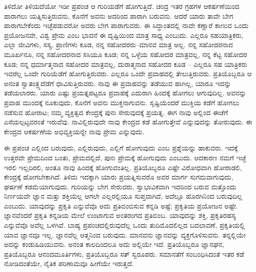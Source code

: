 ತಿಳಿದೋ ತಿಳಿಯದೆಯೋ ಇಡೀ ಪ್ರಪಂಚ ಆ ಗುರಿಯಡೆಗೆ ಹೋಗುತ್ತಿದೆ. ಚಂದ್ರ ಇತರ ಗ್ರಹಗಳ ಆಕರ್ಷಣೆಯಿಂದ ಪಾರಾಗಲು ಯತ್ನಿಸುತ್ತಿರುವನು, ಕೊನೆಗೆ ಅವನು ಅದರಿಂದ ಪಾರಾಗಿ ಬರುವನು. ಆದರೆ ಯಾರು ತಾವೇ ಬೇಗ ಪಾರಾಗಬೇಕೆಂದು ಇಚ್ಛೆಪಡುವರೋ ಅವರು ಬೇಗ ಪಾರಾಗುವರು. ಈ ಸಿದ್ಧಾಂತದಲ್ಲಿ ನಾವೇ ಕಣ್ಣಾರೆ ಕಾಣುವ ಒಂದು ಪ್ರಯೋಜನವೇ, ವಿಶ್ವ ಪ್ರೇಮ ಎಂಬ ಭಾವನೆ ಈ ದೃಷ್ಟಿಯಿಂದ ಮಾತ್ರ ಸಾಧ್ಯ ಎಂಬುದು. ಎಲ್ಲರೂ ಸಹಯಾತ್ರಿಕರು, ಎಲ್ಲಾ ಜೀವಿಗಳು, ಸಸ್ಯ, ಪ್ರಾಣಿಗಳು ಕೂಡ, ನನ್ನ ಸಹೋದರರು–ಮಾನವ ಮಾತ್ರ ಅಲ್ಲ. ನನ್ನ ಸಹೋದರನಾದ ಮೂರ್ಖನೂ, ನನ್ನ ಸಹೋದರನಾದ ಸಸಿಯೂ ಕೂಡ; ನನ್ನ ಒಳ್ಳೆಯ ಸಹೋದರ ಮಾತ್ರವಲ್ಲ, ನನ್ನ ಕೆಟ್ಟ ಸಹೋದರ ಕೂಡ; ನನ್ನ ಧರ್ಮಾತ್ಮನಾದ ಸಹೋದರ ಮಾತ್ರವಲ್ಲ, ದುರಾತ್ಮನಾದ ಸಹೋದರ ಕೂಡ – ಎಲ್ಲರೂ ಸಹ ಯಾತ್ರಿಕರು ಇವರೆಲ್ಲ ಒಂದೇ ಗುರಿಯೆಡೆಗೆ ಹೋಗುತ್ತಿರುವರು. ಎಲ್ಲರೂ ಒಂದೇ ಪ್ರವಾಹದಲ್ಲಿ ತೇಲುತ್ತಿರುವರು. ಪ್ರತಿಯೊಬ್ಬರೂ ಆ ಅನಂತ ಸ್ವಾತಂತ್ರ್ಯದೆಡೆಗೆ ಧಾವಿಸುತ್ತಿರುವರು. ನಾವು ಈ ಪ್ರವಾಹವನ್ನು ತಡೆಯುವ ಹಾಗಿಲ್ಲ, ಯಾರೂ ಇದನ್ನು ತಡೆಯಲಾರರು. ಯಾರು ಎಷ್ಟು ಪ್ರಯತ್ನಪಟ್ಟರೂ ಪ್ರವಾಹಕ್ಕೆ ಎದುರಾಗಿ ಹಿಂದಕ್ಕೆ ಹೋಗಲು ಆಗುವುದಿಲ್ಲ. ಅವನನ್ನು ಪ್ರವಾಹ ಮುಂದಕ್ಕೆ ನೂಕುವುದು, ಕೊನೆಗೆ ಅವನು ಮುಕ್ತನಾಗುವನು. ಸೃಷ್ಟಿಯೆಂದರೆ ಮುಕ್ತಿಯ ಕಡೆಗೆ ಹೋಗಲು ನಡೆಸುವ ಹೋರಾಟ; ನಮ್ಮ ವ್ಯಕ್ತಿತ್ವದ ಕೇಂದ್ರಕ್ಕೆ ಪುನಃ ಸೇರುವುದಕ್ಕೆ ಪ್ರಯತ್ನ. ಈಗ ನಾವು ಅಲ್ಲಿಂದ ಈಚೆಗೆ ಎಸೆಯಲ್ಪಟ್ಟವರಂತೆ ಇರುವೆವು. ನಾವಿಲ್ಲಿರುವುದೇ ನಾವು ಕೇಂದ್ರದ ಕಡೆ ಹೋಗುತ್ತೇವೆ ಎನ್ನುವುದನ್ನು ತೋರುವುದು. ಈ ಕೇಂದ್ರದ ಆಕರ್ಷಣೆಯ ಅಭಿವ್ಯಕ್ತಿಯನ್ನೇ ನಾವು ಪ್ರೇಮ ಎನ್ನುವುದು.

ಈ ಪ್ರಪಂಚ ಎಲ್ಲಿಂದ ಬರುವುದು, ಎಲ್ಲಿರುವುದು, ಎಲ್ಲಿಗೆ ಹೋಗುವುದು ಎಂಬ ಪ್ರಶ್ನೆಯನ್ನು ಹಾಕುವರು. ಇದಕ್ಕೆ ಉತ್ತರವೇ ಪ್ರೇಮದಿಂದ ಬಂತು, ಪ್ರೇಮದಲ್ಲಿದೆ, ಪುನಃ ಪ್ರೇಮಕ್ಕೆ ಹೋಗುವುದು ಎಂಬುದು. ಆದಕಾರಣ ನಮಗೆ ಇಚ್ಛೆ ಇರಲಿ ಇಲ್ಲದಿರಲಿ, ಅಂತೂ ನಾವು ಹಿಂದಕ್ಕೆ ಹೋಗುವಂತಿಲ್ಲ. ಪ್ರತಿಯೊಬ್ಬರೂ ಎಷ್ಟೇ ವಿರೋಧವಾಗಿ ಹೋರಾಡಲಿ, ಕೇಂದ್ರಕ್ಕೆ ಹೋಗಬೇಕಾಗಿದೆ. ತಿಳಿದು ಇದಕ್ಕಾಗಿ ಯಾರು ಪ್ರಯತ್ನಿಸುವರೊ ಅವರ ಮಾರ್ಗ ಸುಗಮವಾಗುವುದು, ಘರ್ಷಣೆ ಕಡಮೆಯಾಗುವುದು. ಗುರಿಯನ್ನು ಬೇಗ ಸೇರುವರು. ಸ್ವಾಭಾವಿಕವಾಗಿ ಇದರಿಂದ ಬರುವ ಮತ್ತೊಂದು ನಿರ್ಣಯವೇ ಜ್ಞಾನ ಮತ್ತು ಶಕ್ತಿಯೆಲ್ಲ ಆಗಲೇ ಎಲ್ಲರಲ್ಲಿಯೂ ಸುಪ್ತವಾಗಿದೆ, ಅದೆಲ್ಲೂ ಹೊರಗಿನಿಂದ ಬರುವುದಿಲ್ಲ ಎಂಬುದು. ಯಾವುದನ್ನು ಪ್ರಕೃತಿ ಎನ್ನುವೆವೊ ಅದು ಪ್ರತಿಬಿಂಬಿಸುವ ಕನ್ನಡಿ ಅಷ್ಟೆ; ಪ್ರಕೃತಿಯ ಪ್ರಯೋಜನ ಅಷ್ಟೇ. ಜ್ಞಾನವೆಂದರೆ ಪ್ರಕೃತಿ ಕನ್ನಡಿಯ ಮೇಲೆ ಉಂಟಾಗುವ ಅಂತರಂಗದ ಪ್ರತಿಬಿಂಬ. ಯಾವುದನ್ನು ಶಕ್ತಿ, ಪ್ರಕೃತಿರಹಸ್ಯ ಎನ್ನುವೆವೊ ಅವೆಲ್ಲ ಒಳಗಿವೆ. ಬಾಹ್ಯ ಪ್ರಪಂಚದಲ್ಲಿರುವುದೆಲ್ಲ ಒಂದು ತುದಿಮೊದಲಿಲ್ಲದ ಬದಲಾವಣೆ, ಪ್ರಕೃತಿಯಲ್ಲಿ ಯಾವ ಜ್ಞಾನವೂ ಇಲ್ಲ. ಜ್ಞಾನವೆಲ್ಲ ಆತ್ಮನಿಂದ ಬರುವುದು. ಮಾನವನು ಜ್ಞಾನವನ್ನು ವ್ಯಕ್ತಗೊಳಿಸುವನು. ತನ್ನಲ್ಲಿಯೇ ಅದನ್ನು ಕಂಡುಹಿಡಿಯುವನು. ಅನಂತ ಕಾಲದಿಂದಲೂ ಅದು ಅಲ್ಲಿಯೇ ಇದೆ. ಪ್ರತಿಯೊಬ್ಬರೂ ಜ್ಞಾನಘನ, ಪ್ರತಿಯೊಬ್ಬರೂ ಆನಂದಮೂರ್ತಿಗಳು, ಪ್ರತಿಯೊಬ್ಬರೂ ಸತ್ ಸ್ವರೂಪರು. ಸಮಾನತೆಗೆ ಸಂಬಂಧಿಸಿದಂತೆ ಇತರ ಕಡೆ ನೋಡಿದಂತೆಯೇ, ನೈತಿಕ ಪರಿಣಾಮವೂ ಹೀಗೆಯೇ ಇರುತ್ತದೆ.

